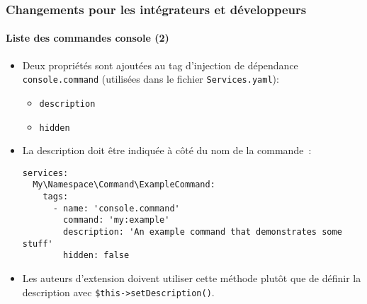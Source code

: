 %

\begin{frame}[fragile]
	\frametitle{Changements pour les intégrateurs et développeurs}
	\framesubtitle{Liste des commandes console (2)}


	\begin{itemize}
		\item Deux propriétés sont ajoutées au tag d'injection de dépendance
			\texttt{console.command} (utilisées dans le fichier \texttt{Services.yaml}):
			\begin{itemize}
				\item \texttt{description}
				\item \texttt{hidden}
			\end{itemize}
			\vspace{0.2cm}
		\item La description doit être indiquée à côté du nom de la commande~:
\begin{lstlisting}
services:
  My\Namespace\Command\ExampleCommand:
    tags:
      - name: 'console.command'
        command: 'my:example'
        description: 'An example command that demonstrates some stuff'
        hidden: false
\end{lstlisting}

		\item Les auteurs d'extension doivent utiliser cette méthode plutôt que de définir
			la description avec \texttt{\$this->setDescription()}.

	\end{itemize}

\end{frame}

